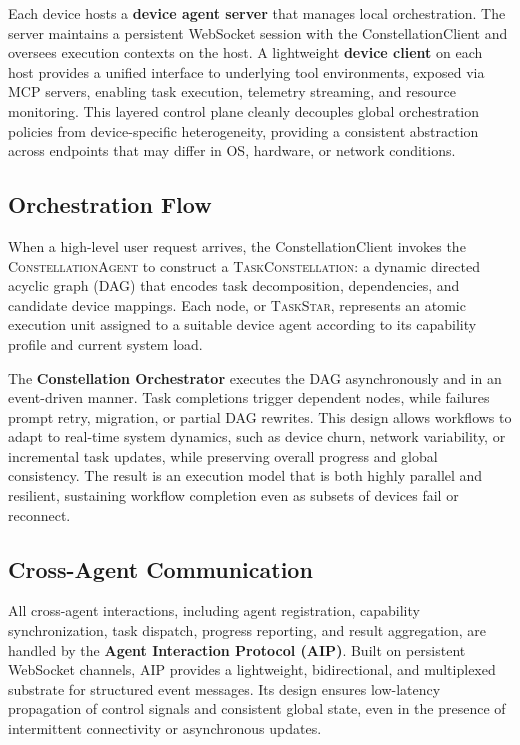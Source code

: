 \documentclass[10pt]{article} %
\newcommand{\cagent}{\textsc{ConstellationAgent}\xspace}
\newcommand{\TaskConstellation}{\textsc{TaskConstellation}\xspace}
\newcommand{\TaskStar}{\textsc{TaskStar}\xspace}
\begin{document}
Each device hosts a \textbf{device agent server} that manages local orchestration. The server maintains a persistent WebSocket session with the ConstellationClient and oversees execution contexts on the host. A lightweight \textbf{device client} on each host provides a unified interface to underlying tool environments, exposed via MCP servers, enabling task execution, telemetry streaming, and resource monitoring. This layered control plane cleanly decouples global orchestration policies from device-specific heterogeneity, providing a consistent abstraction across endpoints that may differ in OS, hardware, or network conditions.

\subsection{Orchestration Flow}
When a high-level user request arrives, the ConstellationClient invokes the \cagent to construct a \TaskConstellation: a dynamic directed acyclic graph (DAG) that encodes task decomposition, dependencies, and candidate device mappings. Each node, or \TaskStar, represents an atomic execution unit assigned to a suitable device agent according to its capability profile and current system load.

The \textbf{Constellation Orchestrator} executes the DAG asynchronously and in an event-driven manner. Task completions trigger dependent nodes, while failures prompt retry, migration, or partial DAG rewrites. This design allows workflows to adapt to real-time system dynamics, such as device churn, network variability, or incremental task updates, while preserving overall progress and global consistency. The result is an execution model that is both highly parallel and resilient, sustaining workflow completion even as subsets of devices fail or reconnect.

\subsection{Cross-Agent Communication}
All cross-agent interactions, including agent registration, capability synchronization, task dispatch, progress reporting, and result aggregation, are handled by the \textbf{Agent Interaction Protocol (AIP)}. Built on persistent WebSocket channels, AIP provides a lightweight, bidirectional, and multiplexed substrate for structured event messages. Its design ensures low-latency propagation of control signals and consistent global state, even in the presence of intermittent connectivity or asynchronous updates.
\end{document}

